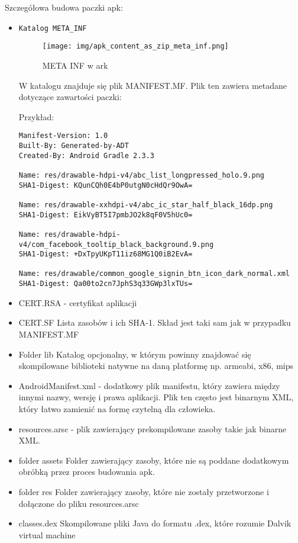 \documentclass[12pt,a4paper,leqno,oneside,titlepage]{book}
\begin{document}
Szczegółowa budowa paczki apk:
\begin{itemize}
\item \texttt{Katalog META\_INF}

\begin{figure}[H]
	\centering
	\texttt{[image: img/apk\_content\_as\_zip\_meta\_inf.png]}
	\caption{META INF w ark}
\end{figure}

W katalogu znajduje się plik MANIFEST.MF. Plik ten zawiera metadane dotyczące zawartości paczki:

Przykład:

\begin{lstlisting}
Manifest-Version: 1.0
Built-By: Generated-by-ADT
Created-By: Android Gradle 2.3.3

Name: res/drawable-hdpi-v4/abc_list_longpressed_holo.9.png
SHA1-Digest: KQunCQh0E4bP0utgN0cHdQr9OwA=

Name: res/drawable-xxhdpi-v4/abc_ic_star_half_black_16dp.png
SHA1-Digest: EikVyBT5I7pmbJO2k8qF0V5hUc0=

Name: res/drawable-hdpi-v4/com_facebook_tooltip_black_background.9.png
SHA1-Digest: +DxTpyUKpT11iz68MG1Q0iB2EvA=

Name: res/drawable/common_google_signin_btn_icon_dark_normal.xml
SHA1-Digest: Qa00to2cn7JphS3q33GWp3lxTUs=
\end{lstlisting}

\item CERT.RSA - certyfikat aplikacji
\item CERT.SF
Lista zasobów i ich SHA-1. Skład jest taki sam jak w przypadku MANIFEST.MF


\item Folder lib
Katalog opcjonalny, w którym powinny znajdować się skompilowane biblioteki natywne na daną platformę np. armeabi, x86, mips

\item AndroidManifest.xml - dodatkowy plik manifestu, który zawiera między innymi nazwy, wersję i prawa aplikacji. Plik ten często jest binarnym XML, który łatwo zamienić na formę czytelną dla człowieka.

\item resources.arsc - plik zawierający prekompilowane zasoby takie jak binarne XML.

\item folder assets
Folder zawierający zasoby, które nie są poddane dodatkowym obróbką przez proces budowania apk.

\item folder res
Folder zawierający zasoby, które nie zostały przetworzone i dołączone do pliku resources.arsc

\item classes.dex Skompilowane pliki Java do formatu .dex, które rozumie Dalvik virtual machine

\end{itemize}
\end{document}

